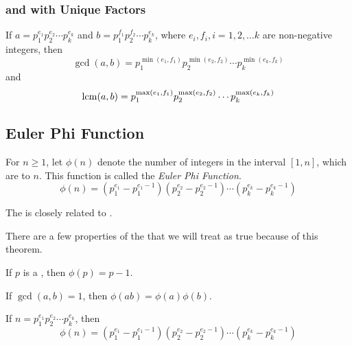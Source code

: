 \subsubsection{ and  with Unique Factors}\label{subsubsec:GCD_LCM_Unique_Factors}
If $a = p_{1}^{e_{1}} p_{2}^{e_{2}} \cdots p_{k}^{e_{k}}$ and $b = p_{1}^{f_{1}} p_{2}^{f_{2}} \cdots p_{k}^{e_{k}}$, where $e_{i}, f_{i}, i = 1, 2, \ldots k$ are non-negative integers, then
\begin{equation}\label{eq:GCD_Unique_Factors}
  \gcd(a, b) = p_{1}^{\min(e_{1}, f_{1})} p_{2}^{\min(e_{2}, f_{2})} \cdots p_{k}^{\min(e_{k}, f_{k})}
\end{equation}
and
\begin{equation}\label{eq:LCM_Unique_Factors}
  \operatorname{\operatorname{lcm}}(a, b) = p_{1}^{\max(e_{1}, f_{1})} p_{2}^{\max(e_{2}, f_{2})} \cdots p_{k}^{\max(e_{k}, f_{k})}
\end{equation}

\subsection{Euler Phi Function}\label{subsec:Euler_Phi_Function}
\begin{definition}\label{def:Euler_Phi_Function}
  For $n \geq 1$, let $\phi(n)$ denote the number of integers in the interval $[1, n]$, which are  to $n$.
  This function is called the \emph{Euler Phi Function}.
  \begin{equation}\label{eq:Euler_Phi_Function}
    \phi(n) = \left( p_{1}^{e_{1}} - p_{1}^{e_{1}-1} \right) \left( p_{2}^{e_{2}} - p_{2}^{e_{2}-1} \right) \cdots \left( p_{k}^{e_{k}} - p_{k}^{e_{k}-1} \right)
  \end{equation}
  \begin{remark}
    The  is closely related to .
  \end{remark}
\end{definition}

\begin{theorem}\label{thm:Euler_Phi_Function}
  There are a few properties of the  that we will treat as true because of this theorem.
  \begin{propertylist}
  \item If $p$ is a , then $\phi(p) = p - 1$.\label{prop:Euler_Phi_Function_Properties-Prime_Number}
  \item If $\gcd(a, b) = 1$, then $\phi(ab) = \phi(a) \phi(b)$.\label{prop:Euler_Phi_Function_Properties-Split_Multiplication}
  \item If $n = p_{1}^{e_{1}} p_{2}^{e_{2}} \cdots p_{k}^{e_{k}}$, then
    \begin{equation*}
      \phi(n) = \left( p_{1}^{e_{1}} - p_{1}^{e_{1}-1} \right) \left( p_{2}^{e_{2}} - p_{2}^{e_{2}-1} \right) \cdots \left( p_{k}^{e_{k}} - p_{k}^{e_{k}-1} \right)
    \end{equation*}\label{prop:Euler_Phi_Function_Properties-Product_of_Primes}
  \end{propertylist}
\end{theorem}


